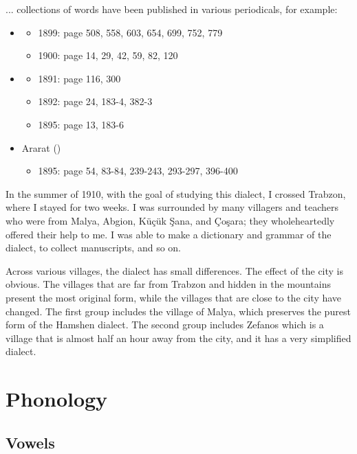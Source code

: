 ... collections of words have been published in various periodicals, for example:

\begin{itemize}
	\item {}
	\begin{itemize}
		\item 1899: page 508, 558, 603, 654, 699, 752, 779
		\item1900: page 14, 29, 42, 59, 82, 120
	\end{itemize}
	\item {}
	\begin{itemize}
		\item 1891: page 116, 300
		\item 1892: page 24, 183-4, 382-3
		\item 1895: page 13, 183-6
		
	\end{itemize}
	\item Ararat ()
	\begin{itemize}
		\item 1895: page 54, 83-84, 239-243, 293-297, 396-400
	\end{itemize}
\end{itemize}

In the summer of 1910, with the goal of studying this dialect, I crossed Trabzon, where I stayed for two weeks. I was surrounded by many villagers and teachers who were from Malya, Abgion, Küçük Şana, and Çoşara; they wholeheartedly offered their help to me. I was able to make a dictionary and grammar of the dialect, to collect manuscripts, and so on. 

Across various villages, the dialect has small differences. The effect of the city is obvious. The villages that are far from Trabzon and hidden in the mountains present the most original form, while the villages that are close to the city have changed. The first group includes the village of Malya, which preserves the purest form of the Hamshen dialect. The second group includes Zefanos which is a village that is almost half an hour away from the city, and it has a very simplified dialect. 

\section{Phonology}

\subsection{Vowels}
